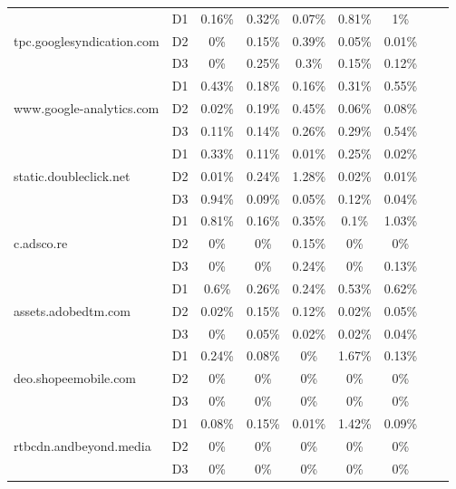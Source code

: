 \begin{table}[!ht]
\begin{tabular}{l|c|c|c|c|c|c|c|c}
        \multirow{3}{*}{tpc.googlesyndication.com} & D1 & 0.16\% & 0.32\% & 0.07\% & 0.81\% & 1\% \\
        ~ & D2 & 0\% & 0.15\% & 0.39\% & 0.05\% & 0.01\% \\
        ~ & D3 & 0\% & 0.25\% & 0.3\% & 0.15\% & 0.12\% \\ \hline
        \multirow{3}{*}{www.google-analytics.com} & D1 & 0.43\% & 0.18\% & 0.16\% & 0.31\% & 0.55\% \\
        ~ & D2 & 0.02\% & 0.19\% & 0.45\% & 0.06\% & 0.08\% \\
        ~ & D3 & 0.11\% & 0.14\% & 0.26\% & 0.29\% & 0.54\% \\ \hline
        \multirow{3}{*}{static.doubleclick.net} & D1 & 0.33\% & 0.11\% & 0.01\% & 0.25\% & 0.02\% \\
        ~ & D2 & 0.01\% & 0.24\% & 1.28\% & 0.02\% & 0.01\% \\
        ~ & D3 & 0.94\% & 0.09\% & 0.05\% & 0.12\% & 0.04\% \\ \hline
        \multirow{3}{*}{c.adsco.re} & D1 & 0.81\% & 0.16\% & 0.35\% & 0.1\% & 1.03\% \\
        ~ & D2 & 0\% & 0\% & 0.15\% & 0\% & 0\% \\
        ~ & D3 & 0\% & 0\% & 0.24\% & 0\% & 0.13\% \\ \hline
        \multirow{3}{*}{assets.adobedtm.com} & D1 & 0.6\% & 0.26\% & 0.24\% & 0.53\% & 0.62\% \\
        ~ & D2 & 0.02\% & 0.15\% & 0.12\% & 0.02\% & 0.05\% \\
        ~ & D3 & 0\% & 0.05\% & 0.02\% & 0.02\% & 0.04\% \\ \hline
        \multirow{3}{*}{deo.shopeemobile.com} & D1 & 0.24\% & 0.08\% & 0\% & 1.67\% & 0.13\% \\ 
        ~ & D2 & 0\% & 0\% & 0\% & 0\% & 0\% \\
        ~ & D3 & 0\% & 0\% & 0\% & 0\% & 0\% \\ \hline
        \multirow{3}{*}{rtbcdn.andbeyond.media} & D1 & 0.08\% & 0.15\% & 0.01\% & 1.42\% & 0.09\% \\
        ~ & D2 & 0\% & 0\% & 0\% & 0\% & 0\% \\
        ~ & D3 & 0\% & 0\% & 0\% & 0\% & 0\% \\ \bottomrule
    \end{tabular}
\end{table}